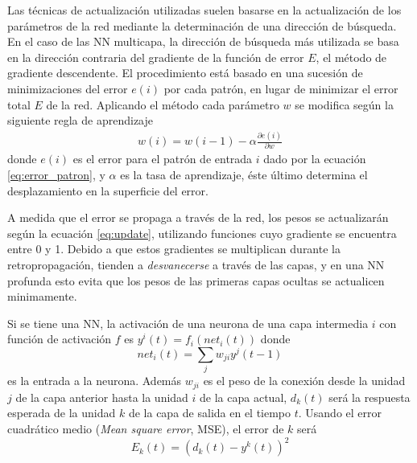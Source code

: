 Las técnicas de actualización utilizadas suelen basarse en la actualización de los parámetros de la red mediante la determinación de una dirección de búsqueda. En el caso de las NN multicapa, la dirección de búsqueda más utilizada se basa en la dirección contraria del gradiente de la función de error $E$, el método de gradiente descendente. El procedimiento está basado en una sucesión de minimizaciones del error $e(i)$ por cada patrón, en lugar de minimizar el error total $E$ de la red. Aplicando el método cada parámetro $w$ se modifica según la siguiente regla de aprendizaje
\begin{eqnarray}
	w(i) = w(i - 1) - \alpha\frac{\partial e(i)}{\partial w}\label{eq:update}
\end{eqnarray}
donde $e(i)$ es el error para el patrón de entrada $i$ dado por la ecuación \ref{eq:error_patron}, y $\alpha$ es la tasa de aprendizaje, éste último determina el desplazamiento en la superficie del error.

A medida que el error se propaga a través de la red, los pesos se actualizarán según la ecuación \ref{eq:update}, utilizando funciones cuyo gradiente se encuentra entre 0 y 1. Debido a que estos gradientes se multiplican durante la retropropagación, tienden a {\em desvanecerse} a través de las capas, y en una NN profunda esto evita que los pesos de las primeras capas ocultas se actualicen minimamente.

Si se tiene una NN, la activación de una neurona de una capa intermedia $i$ con función de activación $f$ es $y^{i}(t) =  f_{i}(net_{i}(t))$ donde $$ net_{i}(t) = \sum_{j}w_{ji}y^{j}(t - 1) $$ es la entrada a la neurona. Además $w_{ji}$ es el peso de la conexión desde la unidad $j$ de la capa anterior hasta la unidad $i$ de la capa actual, $d_{k}(t)$ será la respuesta esperada de la unidad $k$ de la capa de salida en el tiempo $t$. Usando el error cuadrático medio ({\em Mean square error}, MSE), el error de $k$ será
$$ E_{k}(t) = (d_{k}(t) - y^{k}(t))^2 $$




